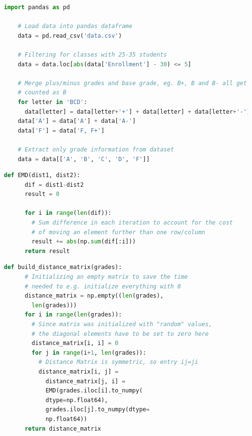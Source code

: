 \documentclass[12pt,letterpaper,oneside,openany]{book}
\begin{document}
\begin{minipage}{\linewidth}
	\begin{lstlisting}[language=Python, caption={Examples for CRUD operations in Python using \code{pandas}}, label={lst:pypd}, captionpos=b]
	import pandas as pd
	
	# Load data into pandas dataframe
	data = pd.read_csv('data.csv')
	
	# Filtering for classes with 25-35 students
	data = data.loc[abs(data['Enrollment'] - 30) <= 5]
	
	# Merge plus/minus grades and base grade, eg. B+, B and B- all get 
	# counted as B
	for letter in 'BCD':
	  data[letter] = data[letter+'+'] + data[letter] + data[letter+'-']
	data['A'] = data['A'] + data['A-']
	data['F'] = data['F, F+']
	
	# Extract only grade information from dataset
	data = data[['A', 'B', 'C', 'D', 'F']]
	\end{lstlisting}
\end{minipage}



\begin{minipage}{\linewidth}
	\begin{lstlisting}[language=Python, caption={Python code to compute the absolute EMD of two distributions}, label={lst:pyemd}, captionpos=b]
	def EMD(dist1, dist2):
	  dif = dist1-dist2
	  result = 0
	
	  for i in range(len(dif)):
	    # Sum difference in each iteration to account for the cost
	    # of moving an element further than one row/column
 	    result += abs(np.sum(dif[:i]))
	  return result
	\end{lstlisting}
\end{minipage}




\begin{minipage}{\linewidth}
	\begin{lstlisting}[language=Python, caption={Python code to compute the distance matrix of  a set of grade distributions, given as a pandas Series object}, label={lst:pydm}, captionpos=b]
	def build_distance_matrix(grades):
	  # Initializing an empty matrix to save the time
	  # needed to e.g. initialize everything with 0
	  distance_matrix = np.empty((len(grades), 
	    len(grades)))
	  for i in range(len(grades)):
	    # Since matrix was initialized with "random" values, 
	    # the diagonal elements have to be set to zero here
	    distance_matrix[i, i] = 0
	    for j in range(i+1, len(grades)):
	      # Distance Matrix is symmetric, so entry ij=ji
	      distance_matrix[i, j] =
	        distance_matrix[j, i] =
	        EMD(grades.iloc[i].to_numpy(
	        dtype=np.float64),
	        grades.iloc[j].to_numpy(dtype=
	        np.float64))
	  return distance_matrix
	\end{lstlisting}
\end{minipage}
\end{document}
